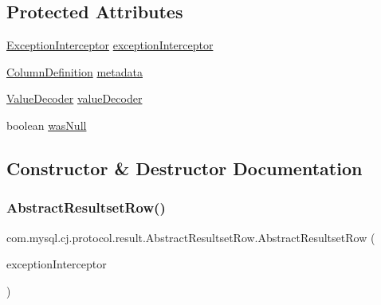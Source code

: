 \subsection*{Protected Attributes}
\begin{DoxyCompactItemize}
\item 
\mbox{\hyperlink{interfacecom_1_1mysql_1_1cj_1_1exceptions_1_1_exception_interceptor}{Exception\+Interceptor}} \mbox{\hyperlink{classcom_1_1mysql_1_1cj_1_1protocol_1_1result_1_1_abstract_resultset_row_a50c0daccb2e9e7e2445af4a09d6fb9d0}{exception\+Interceptor}}
\item 
\mbox{\hyperlink{interfacecom_1_1mysql_1_1cj_1_1protocol_1_1_column_definition}{Column\+Definition}} \mbox{\hyperlink{classcom_1_1mysql_1_1cj_1_1protocol_1_1result_1_1_abstract_resultset_row_aa256b7951746cbcc3979d7474fa50c84}{metadata}}
\item 
\mbox{\hyperlink{interfacecom_1_1mysql_1_1cj_1_1protocol_1_1_value_decoder}{Value\+Decoder}} \mbox{\hyperlink{classcom_1_1mysql_1_1cj_1_1protocol_1_1result_1_1_abstract_resultset_row_a62b113b0142a35b7962695b43b5b8e22}{value\+Decoder}}
\item 
boolean \mbox{\hyperlink{classcom_1_1mysql_1_1cj_1_1protocol_1_1result_1_1_abstract_resultset_row_a26e909a488abbe6e233b88a5f7e72dab}{was\+Null}}
\end{DoxyCompactItemize}


\subsection{Constructor \& Destructor Documentation}
\mbox{\label{classcom_1_1mysql_1_1cj_1_1protocol_1_1result_1_1_abstract_resultset_row_a75a4e08e0b2abc8f5f1b4f2c0c59a1cc}} 
\subsubsection{\texorpdfstring{Abstract\+Resultset\+Row()}{AbstractResultsetRow()}}
{\footnotesize\ttfamily com.\+mysql.\+cj.\+protocol.\+result.\+Abstract\+Resultset\+Row.\+Abstract\+Resultset\+Row (\begin{DoxyParamCaption}\item[{\mbox{\hyperlink{interfacecom_1_1mysql_1_1cj_1_1exceptions_1_1_exception_interceptor}{Exception\+Interceptor}}}]{exception\+Interceptor }\end{DoxyParamCaption})\hspace{0.3cm}{\ttfamily [protected]}}



